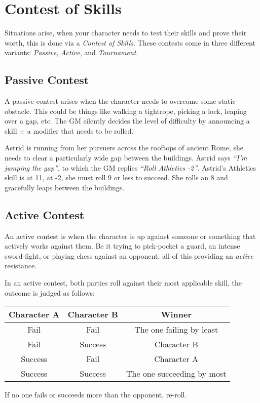 \section{Contest of Skills}\label{sec:contest}
Situations arise, when your character needs to test their skills and prove their worth, this is done via a \textit{Contest of Skills}.
These contests come in three different variants: \textit{Passive}, \textit{Active}, and \textit{Tournament}.

\subsection{Passive Contest}
A passive contest arises when the character needs to overcome some static obstacle. 
This could be things like walking a tightrope, picking a lock, leaping over a gap, etc.
The GM silently decides the level of difficulty by announcing a skill $\pm$ a modifier that needs to be rolled.

\begin{example} 
    Astrid is running from her pursuers across the rooftops of ancient Rome, she needs to clear a particularly wide gap between the buildings. 
    Astrid says \textit{``I'm jumping the gap''}, to which the GM replies \textit{``Roll Athletics -2''}. 
    Astrid's Athletics skill is at 11, at -2, she must roll 9 or less to succeed. She rolls an 8 and gracefully leaps between the buildings.
\end{example}

\subsection{Active Contest}
An active contest is when the character is up against someone or something that actively works against them. 
Be it trying to pick-pocket a guard, an intense sword-fight, or playing chess against an opponent; all of this providing an \textit{active} resistance.

In an active contest, both parties roll against their most applicable skill, the outcome is judged as follows:

\begin{center}
    \begin{tabular}{c|c|c}
    \textbf{Character A} & \textbf{Character B} & \textbf{Winner}\\\hline
    Fail    & Fail    & The one failing by least \\
    Fail    & Success & Character B \\
    Success & Fail    & Character A \\
    Success & Success & The one succeeding by most
    \end{tabular}
\end{center}
If no one fails or succeeds more than the opponent, re-roll.

